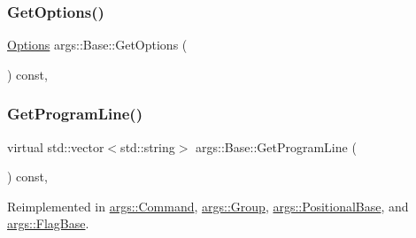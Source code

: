\mbox{\label{classargs_1_1_base_ad44e55adfb22e0ddb0ac5e4248614143}} 
\subsubsection{\texorpdfstring{Get\+Options()}{GetOptions()}}
{\footnotesize\ttfamily \hyperlink{namespaceargs_aa530c0f95194aa275f49a5f299ac9e77}{Options} args\+::\+Base\+::\+Get\+Options (\begin{DoxyParamCaption}{ }\end{DoxyParamCaption}) const\hspace{0.3cm}{\ttfamily [inline]}, {\ttfamily [noexcept]}}

\mbox{\label{classargs_1_1_base_a88fcbbc4bfe3b7af9fafe6e96a19f337}} 
\subsubsection{\texorpdfstring{Get\+Program\+Line()}{GetProgramLine()}}
{\footnotesize\ttfamily virtual std\+::vector$<$std\+::string$>$ args\+::\+Base\+::\+Get\+Program\+Line (\begin{DoxyParamCaption}\item[{const \hyperlink{structargs_1_1_help_params}{Help\+Params} \&}]{ }\end{DoxyParamCaption}) const\hspace{0.3cm}{\ttfamily [inline]}, {\ttfamily [virtual]}}



Reimplemented in \hyperlink{classargs_1_1_command_a37fbbde216ce232279e04edce12c1245}{args\+::\+Command}, \hyperlink{classargs_1_1_group_abe9ab07499ec19e941df8f38e18089df}{args\+::\+Group}, \hyperlink{classargs_1_1_positional_base_a5bf0bc66f4b8cc5aa414fe8976ab8129}{args\+::\+Positional\+Base}, and \hyperlink{classargs_1_1_flag_base_aeb3153e728d38f0f3e0ea5df46fb4acc}{args\+::\+Flag\+Base}.

\mbox{\label{classargs_1_1_base_a78322109f31edba4bb467d73e6663422}} 
